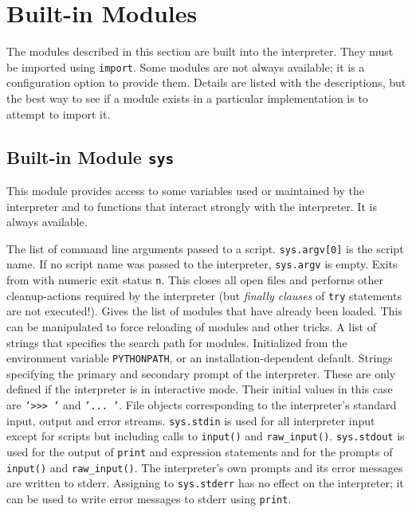 \section{Built-in Modules}

The modules described in this section are built into the interpreter.
They must be imported using
{\tt import}.
Some modules are not always available; it is a configuration option to
provide them.
Details are listed with the descriptions, but the best way to see if
a module exists in a particular implementation is to attempt to import
it.

\subsection{Built-in Module {\tt sys}}

This module provides access to some variables used or maintained by the
interpreter and to functions that interact strongly with the interpreter.
It is always available.
\begin{description}
The list of command line arguments passed to a {\Python} script.
{\tt sys.argv[0]}
is the script name.
If no script name was passed to the {\Python} interpreter,
{\tt sys.argv}
is empty.
Exits from {\Python} with numeric exit status
{\tt n}.
This closes all open files and performs other cleanup-actions required by
the interpreter (but
{\em finally clauses}
of
{\tt try}
statements are not executed!).
Gives the list of modules that have already been loaded.
This can be manipulated to force reloading of modules and other tricks.
A list of strings that specifies the search path for modules.
Initialized from the environment variable {\tt PYTHONPATH}, or an
installation-dependent default.
Strings specifying the primary and secondary prompt of the interpreter.
These are only defined if the interpreter is in interactive mode.
Their initial values in this case are
{\tt '>>> '}
and
{\tt '... '}.
File objects corresponding to the interpreter's standard input, output
and error streams.
{\tt sys.stdin}
is used for all interpreter input except for scripts but including calls
to
{\tt input()}
and
{\tt raw\_input()}.
{\tt sys.stdout}
is used for the output of
{\tt print} and expression statements
and for the prompts of
{\tt input()}
and
{\tt raw\_input()}.
The interpreter's own prompts and its error messages are written to
stderr.
Assigning to
{\tt sys.stderr}
has no effect on the interpreter; it can be used to write error messages
to stderr using
{\tt print}.
\end{description}

